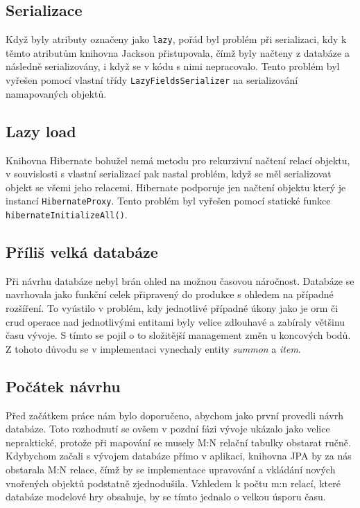 \subsection{Serializace}
Když byly atributy označeny jako \texttt{lazy}, pořád byl problém při serializaci, kdy k těmto atributům knihovna Jackson přistupovala, čímž byly načteny z databáze a následně serializovány, i když se v kódu s nimi nepracovalo. Tento problém byl vyřešen pomocí vlastní třídy \texttt{LazyFieldsSerializer}
na serializování namapovaných objektů. 

\subsection{Lazy load}
Knihovna Hibernate bohužel nemá metodu pro rekurzivní načtení relací objektu, v souvislosti s vlastní serializací pak nastal problém, když se měl serializovat objekt se všemi jeho relacemi. Hibernate podporuje jen načtení objektu který je instancí \texttt{HibernateProxy}. Tento problém byl vyřešen pomocí statické funkce \texttt{hibernateInitializeAll()}. 

\subsection{Příliš velká databáze}
Při návrhu databáze nebyl brán ohled na možnou časovou náročnost. Databáze se navrhovala jako funkční celek připravený do produkce s ohledem na případné rozšíření. To vyústilo v problém, kdy jednotlivé případné úkony jako je \gls{orm} či \gls{crud} operace nad jednotlivými entitami byly velice zdlouhavé a zabíraly většinu času vývoje. S tímto se pojil o to složitější management změn u koncových bodů. Z tohoto důvodu se v implementaci vynechaly entity \textit{summon} a \textit{item}.

\subsection{Počátek návrhu}
Před začátkem práce nám bylo doporučeno, abychom jako první provedli návrh databáze. Toto rozhodnutí se ovšem v pozdní fázi vývoje ukázalo jako velice nepraktické, protože při mapování se musely M:N relační tabulky obstarat ručně. Kdybychom začali s vývojem databáze přímo v aplikaci, knihovna JPA  by za nás obstarala M:N relace, čímž by se implementace upravování a vkládání nových vnořených objektů podstatně zjednodušila. Vzhledem k počtu m:n relací, které databáze modelové hry obsahuje, by se tímto jednalo o velkou úsporu času.
